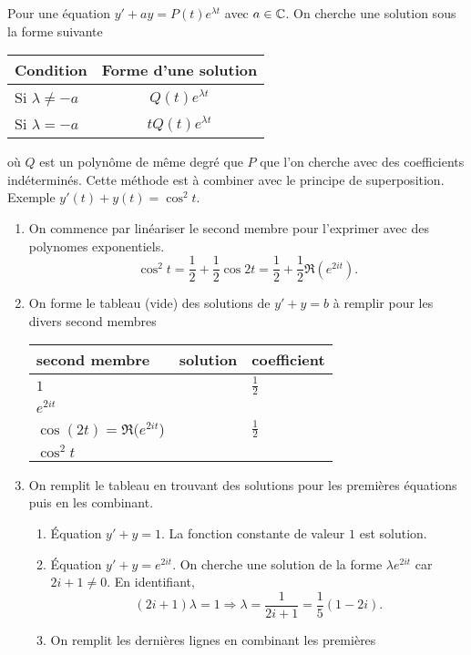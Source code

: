 Pour une équation $y'+ay = P(t)e^{\lambda t}$ avec $a\in \mathbb{C}$. On cherche une solution sous la forme suivante
\begin{center}
\renewcommand{\arraystretch}{1.5}
\begin{tabular}{|l|c|}
\hline 
 Condition            & Forme d'une solution \\ \hline
 Si $\lambda \neq -a$ & $Q(t)e^{\lambda t}$ \\ \hline
 Si $\lambda = -a$    & $tQ(t)e^{\lambda t}$ \\ \hline
\end{tabular}
\end{center}
où $Q$ est un polynôme de même degré que $P$ que l'on cherche avec des coefficients indéterminés. Cette méthode est à combiner avec le principe de superposition.\newline 
Exemple $y'(t) + y(t) =\cos^2 t$.
\begin{enumerate}
  \item On commence par linéariser le second membre pour l'exprimer avec des polynomes exponentiels.
\[
  \cos^2 t = \frac{1}{2} + \frac{1}{2}\cos 2t = \frac{1}{2} + \frac{1}{2}\Re (e^{2it}).
\]

  \item On forme le tableau (vide) des solutions de $y' + y = b$ à remplir pour les divers second membres 
\begin{center}
\renewcommand{\arraystretch}{1.4}
\begin{tabular}{|l|l|l|} \hline
second membre             & solution & coefficient \\ \hline
$1$                       &          & $\frac{1}{2}$ \\ \hline
$e^{2it}$                 &          &  \\ \hline
$\cos(2t) = \Re(e^{2it}$) &          & $\frac{1}{2}$ \\ \hline
$\cos^2 t$                &          &  \\ \hline
\end{tabular}
\end{center}

  \item On remplit le tableau en trouvant des solutions pour les premières équations puis en les combinant.
  \begin{enumerate}
    \item \'Equation $y' + y = 1$. La fonction constante de valeur $1$ est solution.
    \item \'Equation $y' + y = e^{2i t}$. On cherche une solution de la forme $\lambda e^{2i t}$ car $2i + 1 \neq 0$. En identifiant,
\[
  (2i + 1)\lambda = 1 \Rightarrow \lambda = \frac{1}{2i + 1} = \frac{1}{5}(1-2i).
\]
    \item On remplit les dernières lignes en combinant les premières    
  \end{enumerate}
\end{enumerate}
